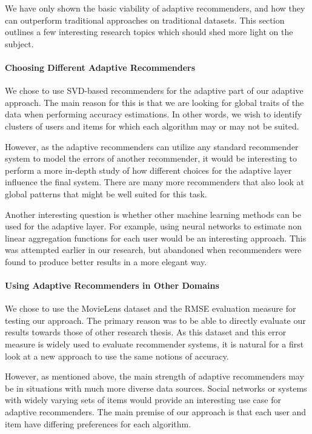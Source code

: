 We have only shown the basic viability of adaptive recommenders,
and how they can outperform traditional approaches on traditional datasets.
This section outlines a few interesting research topics
which should shed more light on the subject.


\paragraph{Choosing Different Adaptive Recommenders}
We chose to use SVD-based recommenders for the adaptive part of our adaptive approach.
The main reason for this is that we are looking for global traits of the data
when performing accuracy estimations. In other words, we wish to identify
clusters of users and items for which each algorithm may or may not be suited.

However, as the adaptive recommenders can utilize any standard recommender system
to model the errors of another recommender, it would be interesting to perform
a more in-depth study of how different choices for the adaptive layer
influence the final system.
There are many more recommenders that also look at global patterns
that might be well suited for this task.

Another interesting question is whether other machine learning methods can be used for the adaptive layer.
For example, using neural networks to estimate non linear aggregation functions for each user would be an interesting approach.
This was attempted earlier in our research, but abandoned when recommenders were found to produce
better results in a more elegant way.


\paragraph{Using Adaptive Recommenders in Other Domains}
We chose to use the MovieLens dataset and the RMSE evaluation measure for testing our approach.
The primary reason was to be able to directly evaluate our results towards those of other research thesis.
As this dataset and this error measure is widely used to evaluate recommender systems,
it is natural for a first look at a new approach to use the same notions of accuracy.

However, as mentioned above, the main strength of adaptive recommenders may be
in situations with much more diverse data sources. Social networks or systems
with widely varying sets of items would provide an interesting use case for adaptive recommenders.
The main premise of our approach is that each user and item have differing preferences
for each algorithm. 

